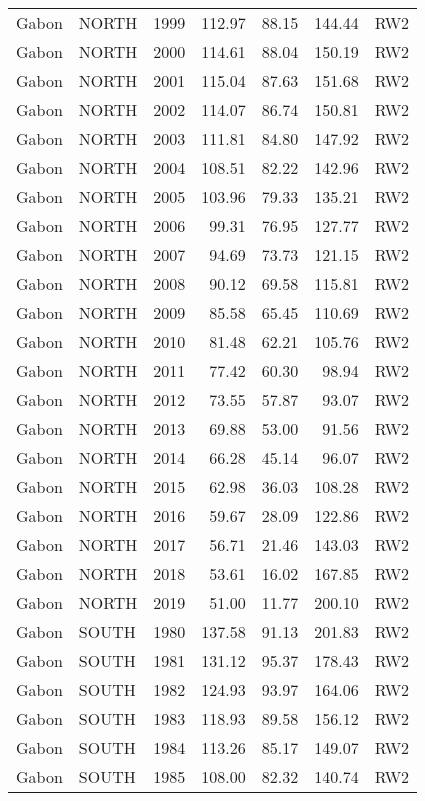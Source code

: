 \begin{longtable}{lllrrrl}
  Gabon & NORTH & 1999 & 112.97 & 88.15 & 144.44 & RW2 \\ 
  Gabon & NORTH & 2000 & 114.61 & 88.04 & 150.19 & RW2 \\ 
  Gabon & NORTH & 2001 & 115.04 & 87.63 & 151.68 & RW2 \\ 
  Gabon & NORTH & 2002 & 114.07 & 86.74 & 150.81 & RW2 \\ 
  Gabon & NORTH & 2003 & 111.81 & 84.80 & 147.92 & RW2 \\ 
  Gabon & NORTH & 2004 & 108.51 & 82.22 & 142.96 & RW2 \\ 
  Gabon & NORTH & 2005 & 103.96 & 79.33 & 135.21 & RW2 \\ 
  Gabon & NORTH & 2006 & 99.31 & 76.95 & 127.77 & RW2 \\ 
  Gabon & NORTH & 2007 & 94.69 & 73.73 & 121.15 & RW2 \\ 
  Gabon & NORTH & 2008 & 90.12 & 69.58 & 115.81 & RW2 \\ 
  Gabon & NORTH & 2009 & 85.58 & 65.45 & 110.69 & RW2 \\ 
  Gabon & NORTH & 2010 & 81.48 & 62.21 & 105.76 & RW2 \\ 
  Gabon & NORTH & 2011 & 77.42 & 60.30 & 98.94 & RW2 \\ 
  Gabon & NORTH & 2012 & 73.55 & 57.87 & 93.07 & RW2 \\ 
  Gabon & NORTH & 2013 & 69.88 & 53.00 & 91.56 & RW2 \\ 
  Gabon & NORTH & 2014 & 66.28 & 45.14 & 96.07 & RW2 \\ 
  Gabon & NORTH & 2015 & 62.98 & 36.03 & 108.28 & RW2 \\ 
  Gabon & NORTH & 2016 & 59.67 & 28.09 & 122.86 & RW2 \\ 
  Gabon & NORTH & 2017 & 56.71 & 21.46 & 143.03 & RW2 \\ 
  Gabon & NORTH & 2018 & 53.61 & 16.02 & 167.85 & RW2 \\ 
  Gabon & NORTH & 2019 & 51.00 & 11.77 & 200.10 & RW2 \\ 
  Gabon & SOUTH & 1980 & 137.58 & 91.13 & 201.83 & RW2 \\ 
  Gabon & SOUTH & 1981 & 131.12 & 95.37 & 178.43 & RW2 \\ 
  Gabon & SOUTH & 1982 & 124.93 & 93.97 & 164.06 & RW2 \\ 
  Gabon & SOUTH & 1983 & 118.93 & 89.58 & 156.12 & RW2 \\ 
  Gabon & SOUTH & 1984 & 113.26 & 85.17 & 149.07 & RW2 \\ 
  Gabon & SOUTH & 1985 & 108.00 & 82.32 & 140.74 & RW2 \\ 

\end{longtable}
